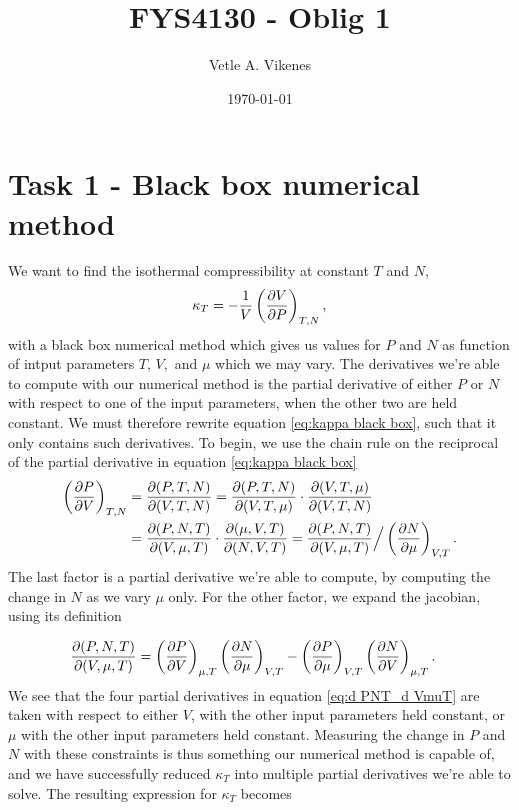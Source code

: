 \documentclass[reprint,english,notitlepage,aps,nobalancelastpage,nofootinbib]{revtex4-1}
\newcommand{\closed}[1]{\left(#1\right)}
\newcommand{\kt}{\kappa_T}
\newcommand{\tmdv}[4]{\closed{\pdv{#1}{#2}}_{#3,#4}}
\newcommand{\jacobian}[2]{\pdv{(#1)}{(#2)}}
\begin{document}
\begin{center}
\title{\Huge FYS4130 - Oblig 1}
\author{\large Vetle A. Vikenes}
\date{\today}
\noaffiliation


\maketitle
\end{center}
\onecolumngrid

\section*{\large Task 1 - Black box numerical method}
We want to find the isothermal compressibility at constant $T$ and $N$,
\begin{align} \label{eq:kappa black box}
	\kt = -\frac{1}{V}\closed{\pdv{V}{P}}_{T,N},
\end{align}
with a black box numerical method which gives us values for $P$ and $N$ as function of intput parameters $T,\,V,$ and $\mu$ which we may vary. The derivatives we're able to compute with our numerical method is the partial derivative of either $P$ or $N$ with respect to one of the input parameters, when the other two are held constant. We must therefore rewrite equation \eqref{eq:kappa black box}, such that it only contains such derivatives. To begin, we use the chain rule on the reciprocal of the partial derivative in equation \eqref{eq:kappa black box}
\begin{align*}
	\tmdv{P}{V}{T}{N} &= \jacobian{P,T,N}{V,T,N}=\jacobian{P,T,N}{V,T,\mu}\cdot\jacobian{V,T,\mu}{V,T,N} \\
	&= \jacobian{P,N,T}{V,\mu,T}\cdot\jacobian{\mu,V,T}{N,V,T}=
	\jacobian{P,N,T}{V,\mu,T} \Big/ \tmdv{N}{\mu}{V}{T}.
\end{align*}
The last factor is a partial derivative we're able to compute, by computing the change in $N$ as we vary $\mu$ only. For the other factor, we expand the jacobian, using its definition 

\begin{align}
	\jacobian{P,N,T}{V,\mu,T} &= \tmdv{P}{V}{\mu}{T}\tmdv{N}{\mu}{V}{T}-\tmdv{P}{\mu}{V}{T}\tmdv{N}{V}{\mu}{T}. \label{eq:d PNT_d VmuT}
\end{align}
We see that the four partial derivatives in equation \eqref{eq:d PNT_d VmuT} are taken with respect to either $V$, with the other input parameters held constant, or $\mu$ with the other input parameters held constant. Measuring the change in $P$ and $N$ with these constraints is thus something our numerical method is capable of, and we have successfully reduced $\kt$ into multiple partial derivatives we're able to solve. The resulting expression for $\kt$ becomes  
\end{document}
